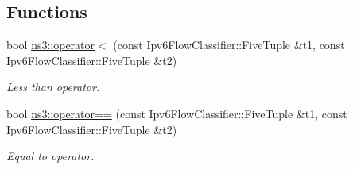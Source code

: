 \subsection*{Functions}
\begin{DoxyCompactItemize}
\item 
bool \hyperlink{namespacens3_ad46b985f1c7486de266c6405f9e4c0e1}{ns3\+::operator$<$} (const Ipv6\+Flow\+Classifier\+::\+Five\+Tuple \&t1, const Ipv6\+Flow\+Classifier\+::\+Five\+Tuple \&t2)
\begin{DoxyCompactList}\small\item\em Less than operator. \end{DoxyCompactList}\item 
bool \hyperlink{namespacens3_a159404cb0d5434816143bcc0319c1c32}{ns3\+::operator==} (const Ipv6\+Flow\+Classifier\+::\+Five\+Tuple \&t1, const Ipv6\+Flow\+Classifier\+::\+Five\+Tuple \&t2)
\begin{DoxyCompactList}\small\item\em Equal to operator. \end{DoxyCompactList}\end{DoxyCompactItemize}
